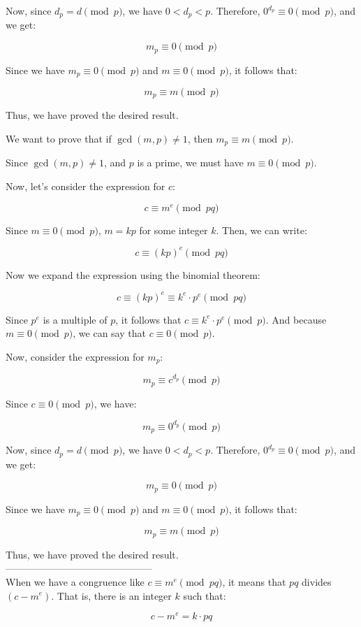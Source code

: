 \documentclass{article}
\theoremstyle{definition}
\begin{document}
	Now, since $d_p = d \pmod p$, we have $0 < d_p < p$. Therefore, $0^{d_p} \equiv 0 \pmod p$, and we get:
	
	$$m_p \equiv 0 \pmod p$$
	
	Since we have $m_p \equiv 0 \pmod p$ and $m \equiv 0 \pmod p$, it follows that:
	
	$$m_p \equiv m \pmod p$$
	
	Thus, we have proved the desired result.
	
	\newpage
	We want to prove that if $\gcd(m, p) \neq 1$, then $m_p \equiv m \pmod{p}$.
	
	Since $\gcd(m, p) \neq 1$, and $p$ is a prime, we must have $m \equiv 0 \pmod p$.
	
	Now, let's consider the expression for $c$:
	
	$$c \equiv m^e \pmod{pq}$$
	
	Since $m \equiv 0 \pmod p$, $m = kp$ for some integer $k$. Then, we can write:
	
	$$c \equiv (kp)^e \pmod{pq}$$
	
	Now we expand the expression using the binomial theorem:
	
	$$c \equiv (kp)^e \equiv k^e \cdot p^e \pmod{pq}$$
	
	Since $p^e$ is a multiple of $p$, it follows that $c \equiv k^e \cdot p^e \pmod{p}$. And because $m \equiv 0 \pmod{p}$, we can say that $c \equiv 0 \pmod{p}$.
	
	Now, consider the expression for $m_p$:
	
	$$m_p \equiv c^{d_p} \pmod p$$
	
	Since $c \equiv 0 \pmod p$, we have:
	
	$$m_p \equiv 0^{d_p} \pmod p$$
	
	Now, since $d_p = d \pmod p$, we have $0 < d_p < p$. Therefore, $0^{d_p} \equiv 0 \pmod p$, and we get:
	
	$$m_p \equiv 0 \pmod p$$
	
	Since we have $m_p \equiv 0 \pmod p$ and $m \equiv 0 \pmod p$, it follows that:
	
	$$m_p \equiv m \pmod p$$
	
	Thus, we have proved the desired result.\\
	---------------------------------------------\\
	When we have a congruence like $c \equiv m^e \pmod{pq}$, it means that $pq$ divides $(c - m^e)$. That is, there is an integer $k$ such that:
	
	$$c - m^e = k \cdot pq$$
	
\end{document}
